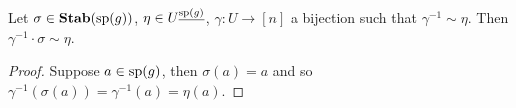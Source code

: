 \documentclass[../paper.tex]{subfiles}
\begin{document}




\begin{claim}
  Let $\sigma \in \text{\textbf{Stab}} (\text{sp} (g))$, $\eta \in U^{\underline{\text{sp}(g)}}$, $\gamma: U
  \rightarrow [n]$ a bijection such that $\gamma^{-1} \sim \eta$. Then
  $\gamma^{-1} \cdot \sigma \sim \eta$.
\end{claim}
\begin{proof}
  Suppose $a \in \text{sp}(g)$, then $\sigma (a) = a$ and so $\gamma^{-1} (\sigma
  (a)) = \gamma^{-1} (a) = \eta (a)$.
\end{proof}
\end{document}
